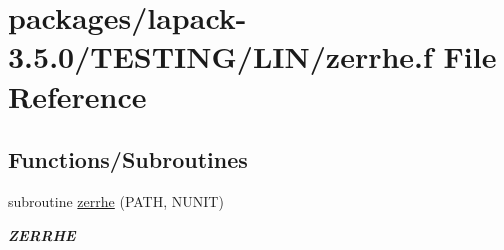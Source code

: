\hypertarget{zerrhe_8f}{}\section{packages/lapack-\/3.5.0/\+T\+E\+S\+T\+I\+N\+G/\+L\+I\+N/zerrhe.f File Reference}
\label{zerrhe_8f}
\subsection*{Functions/\+Subroutines}
\begin{DoxyCompactItemize}
\item 
subroutine \hyperlink{group__complex16__lin_ga2049172c13429dc2d228133d63822449}{zerrhe} (P\+A\+T\+H, N\+U\+N\+I\+T)
\begin{DoxyCompactList}\small\item\em {\bfseries Z\+E\+R\+R\+H\+E} \end{DoxyCompactList}\end{DoxyCompactItemize}
